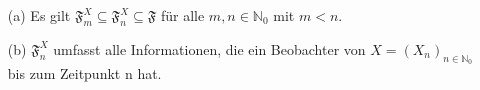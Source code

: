 \mbox{}
\begin{itemize}
\item[(a)]Es gilt $\mathfrak{F}_{m}^{X} \subseteq \mathfrak{F}_{n}^{X} \subseteq \mathfrak{F}$ für alle $m,n \in \mathbb{N}_{0}$ mit $m<n$.
\item[(b)]$\mathfrak{F}_{n}^{X}$ umfasst alle Informationen, die ein Beobachter von $X=(X_{n})_{n \in \mathbb{N}_{0}}$ bis zum Zeitpunkt n hat. 
\end{itemize}